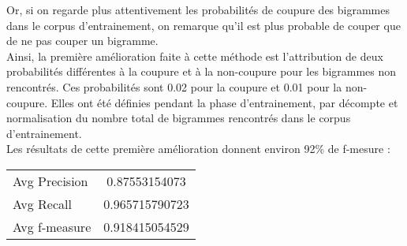 Or, si on regarde plus attentivement les probabilités de coupure des bigrammes dans le corpus d'entrainement, on remarque qu'il est plus probable de couper que de ne pas couper un bigramme. \\

Ainsi, la première amélioration faite à cette méthode est l'attribution de deux probabilités différentes à la coupure et à la non-coupure pour les bigrammes non rencontrés. Ces probabilités sont 0.02 pour la coupure et 0.01 pour la non-coupure. Elles ont été définies pendant la phase d'entrainement, par décompte et normalisation du nombre total de bigrammes rencontrés dans le corpus d'entrainement. \\

Les résultats de cette première amélioration donnent environ 92\% de f-mesure :
\begin{center}
	\begin{tabular}{|l c|}
	  	\hline
	  	Avg Precision & 0.87553154073 \\
		Avg Recall & 0.965715790723 \\
		Avg f-measure & 0.918415054529 \\
	  	\hline
	\end{tabular}
\end{center}
